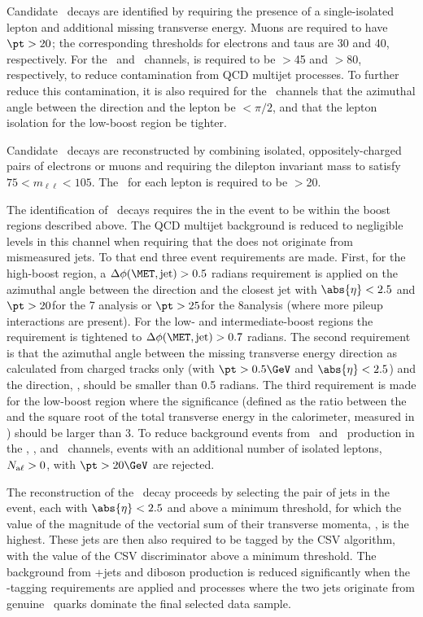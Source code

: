 \documentclass[12pt,twoside,a4paper,cmspaper,final,collab]{cms-tdr}
\begin{document}
Candidate \WtoLN\ decays are identified by requiring
the presence of a single-isolated lepton and additional missing
transverse energy. Muons are required to have $\pt>20$\GeV; the corresponding thresholds for electrons and taus are 30 and
40\GeV, respectively. For the \WlnH\ and \WtnH\ channels, \MET is
required to be $>$45 and $>$80\GeV, respectively,
to reduce contamination from QCD multijet processes. To further reduce
this contamination, it is also required for the \WlnH\
channels that the azimuthal angle between the \MET direction and the lepton be
${<}\pi/2$, and that the lepton isolation for the low-boost
region be tighter.


Candidate \ZtoLL\ decays are reconstructed by combining
isolated, oppositely-charged pairs of electrons or muons and requiring the dilepton invariant
mass to satisfy $75<m_{\ell\ell}<105$\GeV.  The
\pt\ for each lepton is required to be $>$20\GeV.

The identification of \ZtoNN\ decays
requires the \MET in the event to be within the boost regions
described above. The QCD multijet
background is reduced to negligible levels in this channel when requiring that the \MET does not originate from
mismeasured jets. To that end three event requirements are made. First,
for the high-boost region, a $\dphiMJ>0.5$ radians requirement is applied on the azimuthal angle
between the \MET direction and
the closest jet with $\abs{\eta}<2.5$ and $\pt>20$\GeV for the 7\TeV
analysis or $\pt>25$\GeV for the 8\TeV analysis (where more pileup
interactions are
present). For the low- and intermediate-boost regions the requirement is
tightened to $\dphiMJ>0.7$ radians. The second requirement is that the
azimuthal angle between the missing transverse energy direction as
calculated from charged tracks only (with $\pt>0.5\GeV$ and $\abs{\eta}<2.5$) and the \MET direction, \dphiMtrk, should be smaller
than 0.5 radians. The third requirement is made for the low-boost
region where the \MET significance (defined as the ratio between the \MET
and the square root of the total transverse energy in the
calorimeter, measured in \GeV) should be larger than 3.  To reduce background
events from \ttbar\ and \WZ\ production in the \WlnH, \WtnH, and \ZnnH\ channels,
events with an additional number of isolated leptons, $N_{\mathrm{a}\ell} >0$, with $\pt>20\GeV$ are
rejected.

The reconstruction of the \HBB\ decay proceeds by selecting the pair
of jets in the event, each with $\abs{\eta}<2.5$ and \pt above a minimum
threshold, for which the value of the magnitude of the vectorial sum
of their transverse momenta, \ptjj, is the highest.
These jets are then also required to
be tagged by the CSV algorithm, with the value of the CSV discriminator
above a minimum threshold. The background from {\Vvar}+jets and
diboson production is reduced significantly
when the \cPqb-tagging requirements are applied and processes where the two jets originate from
genuine \cPqb\ quarks dominate the final selected data sample.
\end{document}
